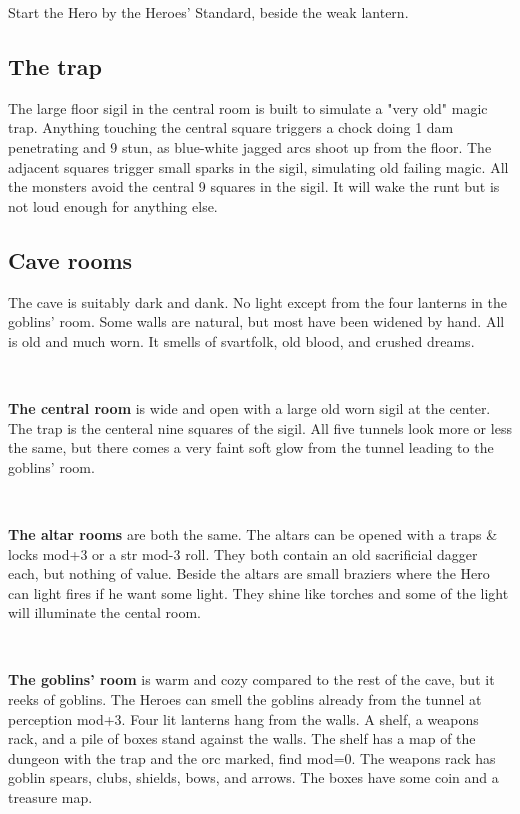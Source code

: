 Start the Hero by the Heroes' Standard, beside the weak lantern.


\subsection*{The trap}

The large floor sigil in the central room is built to simulate a "very old" magic trap. Anything touching the central square triggers a chock doing 1 dam penetrating and 9 stun, as blue-white jagged arcs shoot up from the floor. The adjacent squares trigger small sparks in the sigil, simulating old failing magic. All the monsters avoid the central 9 squares in the sigil. It will wake the runt but is not loud enough for anything else.


\subsection*{Cave rooms}

The cave is suitably dark and dank. No light except from the four lanterns in the goblins' room. Some walls are natural, but most have been widened by hand. All is old and much worn. It smells of svartfolk, old blood, and crushed dreams.

\

\textbf{The central room} is wide and open with a large old worn sigil at the center. The trap is the centeral nine squares of the sigil. All five tunnels look more or less the same, but there comes a very faint soft glow from the tunnel leading to the goblins' room.

\

\textbf{The altar rooms} are both the same. The altars can be opened with a traps \& locks mod+3 or a str mod-3 roll. They both contain an old sacrificial dagger each, but nothing of value. Beside the altars are small braziers where the Hero can light fires if he want some light. They shine like torches and some of the light will illuminate the cental room.

\

\textbf{The goblins' room} is warm and cozy compared to the rest of the cave, but it reeks of goblins. The Heroes can smell the goblins already from the tunnel at perception mod+3. Four lit lanterns hang from the walls. A shelf, a weapons rack, and a pile of boxes stand against the walls. The shelf has a map of the dungeon with the trap and the orc marked, find mod=0. The weapons rack has goblin spears, clubs, shields, bows, and arrows. The boxes have some coin and a treasure map.


